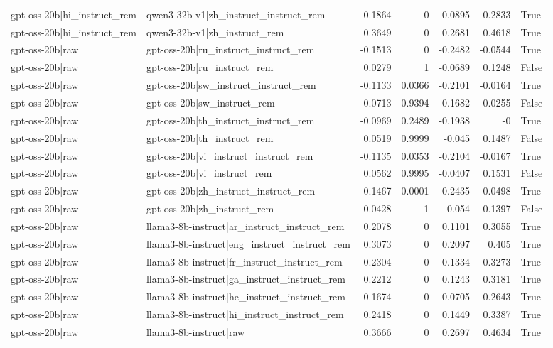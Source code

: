 \begin{table}
\begin{tabular}{l l r r r r l}
gpt-oss-20b|hi_instruct_rem & qwen3-32b-v1|zh_instruct_instruct_rem & 0.1864 & 0 & 0.0895 & 0.2833 & True \\
gpt-oss-20b|hi_instruct_rem & qwen3-32b-v1|zh_instruct_rem & 0.3649 & 0 & 0.2681 & 0.4618 & True \\
gpt-oss-20b|raw & gpt-oss-20b|ru_instruct_instruct_rem & -0.1513 & 0 & -0.2482 & -0.0544 & True \\
gpt-oss-20b|raw & gpt-oss-20b|ru_instruct_rem & 0.0279 & 1 & -0.0689 & 0.1248 & False \\
gpt-oss-20b|raw & gpt-oss-20b|sw_instruct_instruct_rem & -0.1133 & 0.0366 & -0.2101 & -0.0164 & True \\
gpt-oss-20b|raw & gpt-oss-20b|sw_instruct_rem & -0.0713 & 0.9394 & -0.1682 & 0.0255 & False \\
gpt-oss-20b|raw & gpt-oss-20b|th_instruct_instruct_rem & -0.0969 & 0.2489 & -0.1938 & -0 & True \\
gpt-oss-20b|raw & gpt-oss-20b|th_instruct_rem & 0.0519 & 0.9999 & -0.045 & 0.1487 & False \\
gpt-oss-20b|raw & gpt-oss-20b|vi_instruct_instruct_rem & -0.1135 & 0.0353 & -0.2104 & -0.0167 & True \\
gpt-oss-20b|raw & gpt-oss-20b|vi_instruct_rem & 0.0562 & 0.9995 & -0.0407 & 0.1531 & False \\
gpt-oss-20b|raw & gpt-oss-20b|zh_instruct_instruct_rem & -0.1467 & 0.0001 & -0.2435 & -0.0498 & True \\
gpt-oss-20b|raw & gpt-oss-20b|zh_instruct_rem & 0.0428 & 1 & -0.054 & 0.1397 & False \\
gpt-oss-20b|raw & llama3-8b-instruct|ar_instruct_instruct_rem & 0.2078 & 0 & 0.1101 & 0.3055 & True \\
gpt-oss-20b|raw & llama3-8b-instruct|eng_instruct_instruct_rem & 0.3073 & 0 & 0.2097 & 0.405 & True \\
gpt-oss-20b|raw & llama3-8b-instruct|fr_instruct_instruct_rem & 0.2304 & 0 & 0.1334 & 0.3273 & True \\
gpt-oss-20b|raw & llama3-8b-instruct|ga_instruct_instruct_rem & 0.2212 & 0 & 0.1243 & 0.3181 & True \\
gpt-oss-20b|raw & llama3-8b-instruct|he_instruct_instruct_rem & 0.1674 & 0 & 0.0705 & 0.2643 & True \\
gpt-oss-20b|raw & llama3-8b-instruct|hi_instruct_instruct_rem & 0.2418 & 0 & 0.1449 & 0.3387 & True \\
gpt-oss-20b|raw & llama3-8b-instruct|raw & 0.3666 & 0 & 0.2697 & 0.4634 & True \\

\end{tabular}
\end{table}
